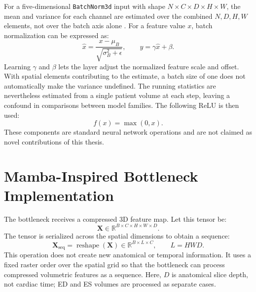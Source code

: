 For a five-dimensional \texttt{BatchNorm3d} input with shape
\(N\times C\times D\times H\times W\), the mean and variance for each channel
are estimated over the combined \(N,D,H,W\) elements, not over the batch axis
alone \citep{ioffe2015batch}. For a feature value $x$, batch normalization can
be expressed as:
\begin{equation}
    \hat{x}=\frac{x-\mu_{B}}{\sqrt{\sigma_{B}^2+\epsilon}}, \qquad y=\gamma\hat{x}+\beta.
\end{equation}
Learning $\gamma$ and $\beta$ lets the layer adjust the normalized feature
scale and offset. With spatial elements contributing to the estimate, a batch
size of one does not automatically make the variance undefined. The running
statistics are nevertheless estimated from a single patient volume at each
step, leaving a confound in comparisons between model families. The following ReLU is then
used:
\begin{equation}
    f(x)=\max(0,x).
\end{equation}
These components are standard neural network operations and are not claimed as novel contributions of this thesis.

\section{Mamba-Inspired Bottleneck Implementation}
The bottleneck receives a compressed 3D feature map. Let this tensor be:
\begin{equation}
    \mathbf{X}\in\mathbb{R}^{B\times C\times H\times W\times D}.
\end{equation}
The tensor is serialized across the spatial dimensions to obtain a sequence:
\begin{equation}
    \mathbf{X}_{\mathrm{seq}}=\operatorname{reshape}(\mathbf{X})\in\mathbb{R}^{B\times L\times C}, \qquad L=HWD.
\end{equation}
This operation does not create new anatomical or temporal information. It uses a fixed raster order over the spatial grid so that the bottleneck can process compressed volumetric features as a sequence. Here, $D$ is anatomical slice depth, not cardiac time; ED and ES volumes are processed as separate cases.

